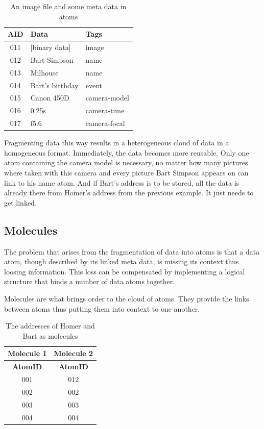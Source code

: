 \documentclass[12pt,a4paper,notitlepage,twocolumn,oneside]{article}
\begin{document}
\begin{table}[htp]
\centering
\begin{tabular}{|c|l|l|}
\hline
\textbf{AID} & \textbf{Data} & \textbf{Tags} \\
\hline
011 & [binary data] & image \\
012 & Bart Simpson & name \\
013 & Milhouse & name \\
014 & Bart's birthday & event \\
015 & Canon 450D & camera-model \\
016 & 0.25s & camera-time \\
017 & f5.6 & camera-focal \\
\hline
\end{tabular}
\caption{An image file and some meta data in atoms}
\label{image_file}
\end{table}

Fragmenting data this way results in a heterogeneous cloud of data in a homogeneous format. Immediately, the data becomes more reusable. Only one atom containing the camera model is necessary, no matter how many pictures where taken with this camera and every picture Bart Simpson appears on can link to his name atom. And if Bart's address is to be stored, all the data is already there from Homer's address from the previous example. It just needs to get linked.

\subsection{Molecules}\label{molecules}
The problem that arises from the fragmentation of data into atoms is that a data atom, though described by its linked meta data, is missing its context thus loosing information. This loss can be compensated by implementing a logical structure that binds a number of data atoms together.

Molecules are what brings order to the cloud of atoms. They provide the links between atoms thus putting them into context to one another.

\begin{table}[htp]
\centering
\begin{tabular}{|c||c|}
\hline
Molecule 1 & Molecule 2 \\
\hline
\textbf{AtomID} & \textbf{AtomID} \\
\hline
001 & 012 \\
002 & 002 \\
003 & 003 \\
004 & 004 \\
\hline
\end{tabular}

\caption{The addresses of Homer and Bart as molecules}
\label{addresses_simpsons}
\end{table}
\end{document}

